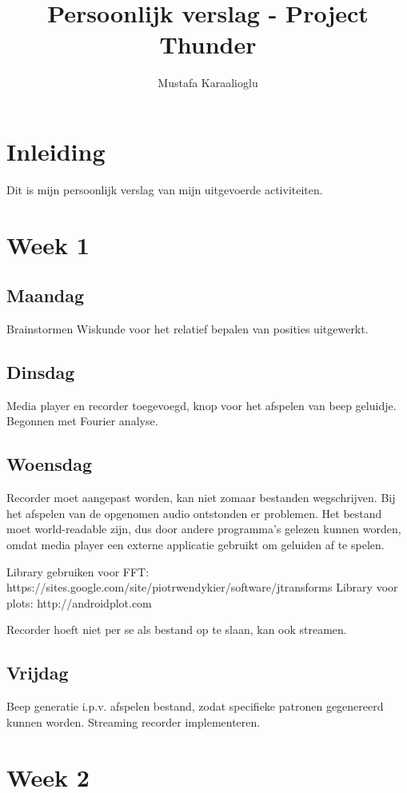 \documentclass[12pt]{article}
\author{Mustafa Karaalioglu}
\begin{document}
\title{Persoonlijk verslag - Project Thunder}
\maketitle

\section*{Inleiding}
Dit is mijn persoonlijk verslag van mijn uitgevoerde activiteiten.

\section*{Week 1}
\subsection*{Maandag}
Brainstormen
Wiskunde voor het relatief bepalen van posities uitgewerkt.

\subsection*{Dinsdag}
Media player en recorder toegevoegd, knop voor het afspelen van beep geluidje. Begonnen met Fourier analyse.

\subsection*{Woensdag}
Recorder moet aangepast worden, kan niet zomaar bestanden wegschrijven. Bij het afspelen van de opgenomen audio ontstonden er problemen. Het bestand moet world-readable zijn, dus door andere programma's gelezen kunnen worden, omdat media player een externe applicatie gebruikt om geluiden af te spelen.

Library gebruiken voor FFT: https://sites.google.com/site/piotrwendykier/software/jtransforms Library voor plots: http://androidplot.com

Recorder hoeft niet per se als bestand op te slaan, kan ook streamen.

\subsection*{Vrijdag}
Beep generatie i.p.v. afspelen bestand, zodat specifieke patronen gegenereerd kunnen worden. Streaming recorder implementeren.

\section*{Week 2}
\end{document}
